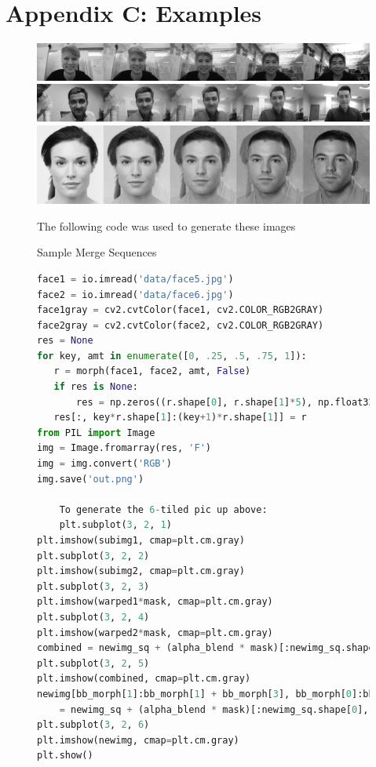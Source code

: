 \documentclass[journal]{IEEEtran}
\begin{document}
\section{Appendix C: Examples}
\begin{figure}[!t]\label{fig:merge}
	\includegraphics[width = \linewidth]{sample1}
	\includegraphics[width = \linewidth]{sample2}
	\includegraphics[width = \linewidth]{sample3}
	\caption{Sample Merge Sequences}
The following code was used to generate these images
\end{figure}

\begin{figure}[!t]\label{fig:code}
\begin{lstlisting}[language=Python]
face1 = io.imread('data/face5.jpg')
face2 = io.imread('data/face6.jpg')
face1gray = cv2.cvtColor(face1, cv2.COLOR_RGB2GRAY)
face2gray = cv2.cvtColor(face2, cv2.COLOR_RGB2GRAY)
res = None
for key, amt in enumerate([0, .25, .5, .75, 1]):
   r = morph(face1, face2, amt, False)
   if res is None:
       res = np.zeros((r.shape[0], r.shape[1]*5), np.float32)
   res[:, key*r.shape[1]:(key+1)*r.shape[1]] = r
from PIL import Image
img = Image.fromarray(res, 'F')
img = img.convert('RGB')
img.save('out.png')

	To generate the 6-tiled pic up above:
	plt.subplot(3, 2, 1)
plt.imshow(subimg1, cmap=plt.cm.gray)
plt.subplot(3, 2, 2)
plt.imshow(subimg2, cmap=plt.cm.gray)
plt.subplot(3, 2, 3)
plt.imshow(warped1*mask, cmap=plt.cm.gray)
plt.subplot(3, 2, 4)
plt.imshow(warped2*mask, cmap=plt.cm.gray)
combined = newimg_sq + (alpha_blend * mask)[:newimg_sq.shape[0], :newimg_sq.shape[1]]
plt.subplot(3, 2, 5)
plt.imshow(combined, cmap=plt.cm.gray)
newimg[bb_morph[1]:bb_morph[1] + bb_morph[3], bb_morph[0]:bb_morph[0] + bb_morph[2]] 
	= newimg_sq + (alpha_blend * mask)[:newimg_sq.shape[0], :newimg_sq.shape[1]]
plt.subplot(3, 2, 6)
plt.imshow(newimg, cmap=plt.cm.gray)
plt.show()

\end{lstlisting}
\end{figure}

\end{document}
